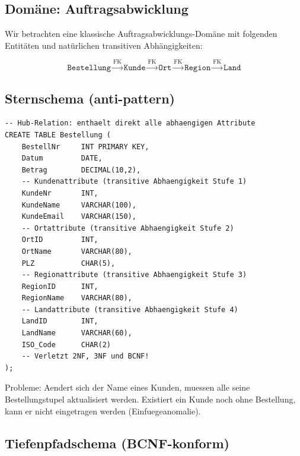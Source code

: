 ﻿\documentclass[a4paper,12pt]{report}
\theoremstyle{definition}
\theoremstyle{remark}
\begin{document}
\subsection{Domäne: Auftragsabwicklung}

Wir betrachten eine klassische Auftragsabwicklungs-Domäne mit folgenden
Entitäten und natürlichen transitiven Abhängigkeiten:

\[
  \texttt{Bestellung} \xrightarrow{\text{FK}} \texttt{Kunde}
  \xrightarrow{\text{FK}} \texttt{Ort}
  \xrightarrow{\text{FK}} \texttt{Region}
  \xrightarrow{\text{FK}} \texttt{Land}
\]

\subsection{Sternschema (anti-pattern)}

\begin{lstlisting}[caption={Anti-Pattern: Sternschema mit denormalisierten Attributen in Hub-Relation},label=lst:stern]
-- Hub-Relation: enthaelt direkt alle abhaengigen Attribute
CREATE TABLE Bestellung (
    BestellNr     INT PRIMARY KEY,
    Datum         DATE,
    Betrag        DECIMAL(10,2),
    -- Kundenattribute (transitive Abhaengigkeit Stufe 1)
    KundeNr       INT,
    KundeName     VARCHAR(100),
    KundeEmail    VARCHAR(150),
    -- Ortattribute (transitive Abhaengigkeit Stufe 2)
    OrtID         INT,
    OrtName       VARCHAR(80),
    PLZ           CHAR(5),
    -- Regionattribute (transitive Abhaengigkeit Stufe 3)
    RegionID      INT,
    RegionName    VARCHAR(80),
    -- Landattribute (transitive Abhaengigkeit Stufe 4)
    LandID        INT,
    LandName      VARCHAR(60),
    ISO_Code      CHAR(2)
    -- Verletzt 2NF, 3NF und BCNF!
);
\end{lstlisting}

Probleme: Aendert sich der Name eines Kunden, muessen alle seine
Bestellungstupel aktualisiert werden. Existiert ein Kunde noch ohne
Bestellung, kann er nicht eingetragen werden (Einfuegeanomalie).

\subsection{Tiefenpfadschema (BCNF-konform)}
\end{document}
